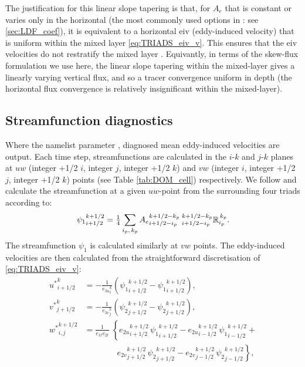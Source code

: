 \documentclass[../main/NEMO_manual]{subfiles}
\newcommand{\triadd}[5]{\ensuremath{{}_{#1}^{#2}{\mathbb{#3}}_{#4}^{\,#5}}}
\begin{document}
The justification for this linear slope tapering is that, for $A_e$ that is constant or varies only in
the horizontal (the most commonly used options in \NEMO: see \autoref{sec:LDF_coef}),
it is equivalent to a horizontal eiv (eddy-induced velocity) that is uniform within the mixed layer
\autoref{eq:TRIADS_eiv_v}.
This ensures that the eiv velocities do not restratify the mixed layer \citep{treguier.held.ea_JPO97,danabasoglu.ferrari.ea_JC08}.
Equivantly, in terms of the skew-flux formulation we use here,
the linear slope tapering within the mixed-layer gives a linearly varying vertical flux,
and so a tracer convergence uniform in depth
(the horizontal flux convergence is relatively insignificant within the mixed-layer).

\subsection{Streamfunction diagnostics}
\label{sec:TRIADS_sfdiag}

Where the namelist parameter ,
diagnosed mean eddy-induced velocities are output.
Each time step, streamfunctions are calculated in the $i$-$k$ and $j$-$k$ planes at
$uw$ (integer +1/2 $i$, integer $j$, integer +1/2 $k$) and $vw$ (integer $i$, integer +1/2 $j$, integer +1/2 $k$)
points (see Table \autoref{tab:DOM_cell}) respectively.
We follow \citep{griffies_bk04} and calculate the streamfunction at a given $uw$-point from
the surrounding four triads according to:
\[
  {\psi_1}_{i+1/2}^{k+1/2}={\fractext{1}{4}}\sum_{\substack{i_p,\,k_p}}
  {A_e}_{i+1/2-i_p}^{k+1/2-k_p}\:\triadd{i+1/2-i_p}{k+1/2-k_p}{R}{i_p}{k_p}.
\]
The streamfunction $\psi_1$ is calculated similarly at $vw$ points.
The eddy-induced velocities are then calculated from the straightforward discretisation of \autoref{eq:TRIADS_eiv_v}:
\[
  \begin{split}
    {u^*}_{i+1/2}^{k} & = - \frac{1}{{e_{3u}}_{i}^{k}}\left({\psi_1}_{i+1/2}^{k+1/2}-{\psi_1}_{i+1/2}^{k+1/2}\right),   \\
    {v^*}_{j+1/2}^{k} & = - \frac{1}{{e_{3v}}_{j}^{k}}\left({\psi_2}_{j+1/2}^{k+1/2}-{\psi_2}_{j+1/2}^{k+1/2}\right),   \\
    {w^*}_{i,j}^{k+1/2} & =    \frac{1}{e_{1t}e_{2t}}\; \left\{
      {e_{2u}}_{i+1/2}^{k+1/2} \,{\psi_1}_{i+1/2}^{k+1/2} -
      {e_{2u}}_{i-1/2}^{k+1/2} \,{\psi_1}_{i-1/2}^{k+1/2} \right. + \\
    \phantom{=} & \qquad\qquad\left. {e_{2v}}_{j+1/2}^{k+1/2} \,{\psi_2}_{j+1/2}^{k+1/2} - {e_{2v}}_{j-1/2}^{k+1/2} \,{\psi_2}_{j-1/2}^{k+1/2} \right\},
  \end{split}
\]

\subinc{}
\end{document}
